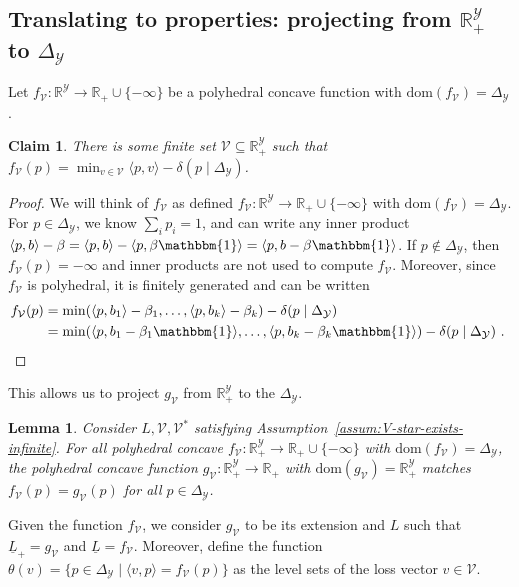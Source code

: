 \documentclass[11pt]{article}
\newcommand{\Comments}{1}
\newcommand{\mynote}[2]{\ifnum\Comments=1\textcolor{#1}{#2}\fi}
\newcommand{\raf}[1]{\mynote{darkgreen}{[RF: #1]}}
\newcommand{\reals}{\mathbb{R}}
\newcommand{\dom}{\mathrm{dom}}
\newcommand{\prop}[1]{\mathrm{prop}[#1]}
\newcommand{\simplex}{\Delta_\Y}
\newcommand{\V}{\mathcal{V}}
\newcommand{\Y}{\mathcal{Y}}
\newcommand{\risk}[1]{\underline{#1}}
\newcommand{\inprod}[2]{\langle #1, #2 \rangle}%
\newcommand{\ones}{\mathbbm{1}}
\newtheorem{lemma}{Lemma}
\newtheorem{claim}{Claim}
\begin{document}
\subsection{Translating to properties: projecting from $\reals^\Y_+$ to $\simplex$}\label{subsec:project-f}

Let $f_\V:\reals^\Y\to\reals_+\cup\{-\infty\}$ be a polyhedral concave function with $\dom(f_\V) = \simplex$. %
\begin{claim}\label{claim:f-min-affine}
	There is some finite set $\V \subseteq \reals^\Y_+$ such that $f_\V(p) = \min_{v\in\V} \inprod{p}{v} - \delta(p \mid \simplex)$.  %
\end{claim}
\begin{proof}
  We will think of $f_\V$ as defined $f_\V:\reals^\Y\to\reals_+\cup\{-\infty\}$  with $\dom(f_\V) = \simplex$.
  For $p \in \simplex$, we know $\sum_i p_i = 1$, and can write any inner product $\inprod{p}{b} - \beta = \inprod{p}{b} - \inprod{p}{\beta \ones} = \inprod{p}{b - \beta \ones}$.
  If $p \not \in \simplex$, then $f_\V(p) = -\infty$ and inner products are not used to compute $f_\V$.
  Moreover, since $f_\V$ is polyhedral, it is finitely generated \citep[Proposition 19.1.2]{rockafellar1997convex} and can be written 
	\begin{align*}
	f_\V(p) %
		 &= \min(\inprod{p}{b_1} - \beta_1, \ldots, \inprod{p}{b_k} - \beta_k) - \delta(p \mid \simplex)\\
		 &= \min(\inprod{p}{b_1 - \beta_1 \ones}, \ldots, \inprod{p}{b_k - \beta_k \ones}) - \delta(p \mid \simplex)~.~
	\end{align*}
\end{proof}

This allows us to project $g_\V$ from $\reals^\Y_+$ to the $\simplex$.
\begin{lemma}\label{cor:f-matches-g-on-simplex}
  Consider $L, \V, \V^*$ satisfying Assumption~\ref{assum:V-star-exists-infinite}.
  For all polyhedral concave $f_\V : \reals^\Y_+ \to \reals_+ \cup \{-\infty\}$ with $\dom(f_\V) = \simplex$, the polyhedral concave function $g_\V : \reals^\Y_+ \to \reals_+$ with $\dom(g_\V) = \reals^\Y_+$ matches $f_\V(p) = g_\V(p)$ for all $p \in \simplex$.
\end{lemma}
Given the function $f_\V$, we consider $g_\V$ to be its extension and $L$ such that $\risk L_+ = g_\V$ and $\risk L = f_\V$.
Moreover, define the function $\theta(v) = \{p \in \simplex \mid \inprod{v}{p} = f_\V(p)\}$ as the level sets of the loss vector $v \in \V$. %
\end{document}
